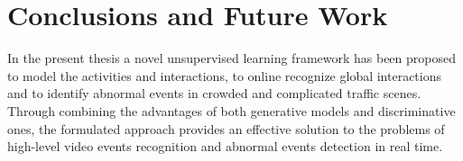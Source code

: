 \chapter{Conclusions and Future Work}
\label{chap:conclusion}
In the present thesis a novel unsupervised learning framework has been proposed to model the activities and interactions, to online recognize global interactions and to identify abnormal events in crowded and complicated traffic scenes. Through combining the advantages of both generative models and discriminative ones, the formulated approach provides an effective solution to the problems of high-level video events recognition and abnormal events detection in real time. 
